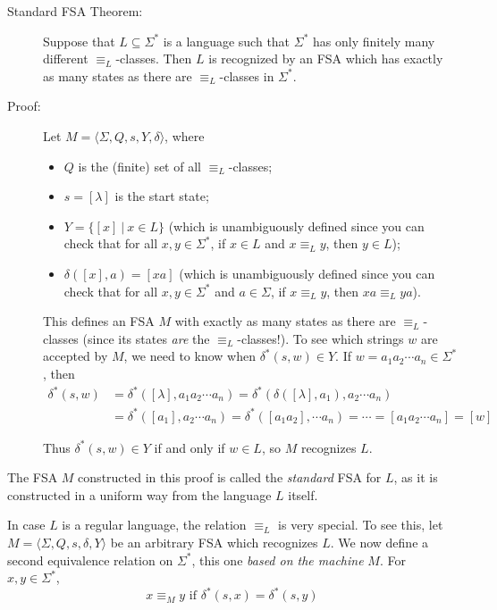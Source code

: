 \documentclass{article}
\begin{document}
\begin{description}

\item[Standard FSA Theorem:] Suppose that $L \subseteq \Sigma^*$ is a language such that $\Sigma^*$ has only finitely many different $\equiv_L$-classes. Then $L$ is recognized by an FSA which has exactly as many states as there are $\equiv_L$-classes in $\Sigma^*$.

\item[Proof:] Let $M = \langle \Sigma, Q, s, Y, \delta \rangle$, where
  \begin{itemize}
    \item $Q$ is the (finite) set of all $\equiv_L$-classes; 
    \item $s = [\lambda]$ is the start state; 
    \item $Y = \{ [x]\ |\ x \in L \}$ (which is unambiguously defined since you can check that for all $x,y \in \Sigma^*$, if $x \in L$ and $x \equiv_L y$, then $y \in L$);
    \item $\delta([x],a) = [xa]$ (which is unambiguously defined since you can check that for all $x,y \in \Sigma^*$ and $a \in \Sigma$, if $x\equiv_L y$, then $xa \equiv_L ya$).
  \end{itemize}

  This defines an FSA $M$ with exactly as many states as there are $\equiv_L$-classes (since its states \emph{are} the $\equiv_L$-classes!). To see which strings $w$ are accepted by $M$, we need to know when $\delta^*(s,w) \in Y$. If $w = a_1 a_2 \cdots a_n \in \Sigma^*$, then
  \begin{align*}
  \delta^*(s,w) & = \delta^*([\lambda], a_1 a_2 \cdots a_n)  =  \delta^*(\delta([\lambda],a_1), a_2 \cdots a_n) \\
                & = \delta^*([a_1], a_2 \cdots a_n)  =  \delta^*([a_1 a_2], \cdots a_n)  =  \cdots = [a_1 a_2 \cdots a_n] = [w]
  \end{align*}

  Thus $\delta^*(s,w) \in Y$ if and only if $w \in L$, so $M$ recognizes $L$.

\end{description}

The FSA $M$ constructed in this proof is called the \emph{standard} FSA for $L$, as it is constructed in a uniform way from the language $L$ itself. 

In case $L$ is a regular language, the relation $\equiv_L$ is very special. To see this, let $M = \langle \Sigma, Q, s, \delta, Y \rangle$ be an arbitrary FSA which recognizes $L$. We now define a second equivalence relation on $\Sigma^*$, this one \emph{based on the machine} $M$. For $x,y \in \Sigma^*$,
\begin{equation*}
x \equiv_{M} y \text{ if } \delta^*(s,x) = \delta^*(s,y)
\end{equation*}
\end{document}
